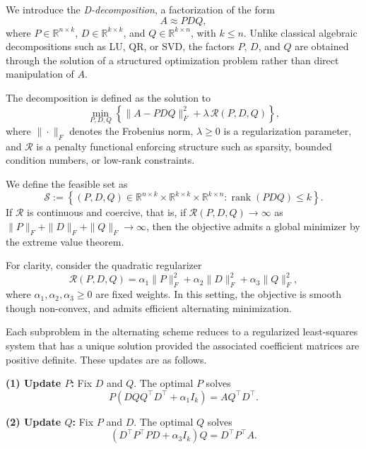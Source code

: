 \documentclass[10pt,a4paper]{article}
\begin{document}
We introduce the \emph{D-decomposition}, a factorization of the form
\[
A \approx P D Q,
\]
where \( P \in \mathbb{R}^{n \times k} \), \( D \in \mathbb{R}^{k \times k} \), and \( Q \in \mathbb{R}^{k \times n} \), with \( k \leq n \). Unlike classical algebraic decompositions such as LU, QR, or SVD, the factors \( P \), \( D \), and \( Q \) are obtained through the solution of a structured optimization problem rather than direct manipulation of \( A \).

The decomposition  is defined as the solution to
\[
\min_{P, D, Q} \left\{ \|A - P D Q\|_F^2 + \lambda \, \mathcal{R}(P, D, Q) \right\},
\]
where \( \| \cdot \|_F \) denotes the Frobenius norm, \( \lambda \geq 0 \) is a regularization parameter, and \( \mathcal{R} \) is a penalty functional enforcing structure such as sparsity, bounded condition numbers, or low-rank constraints.

We define the feasible set as
\[
\mathcal{S} := \left\{ (P, D, Q) \in \mathbb{R}^{n \times k} \times \mathbb{R}^{k \times k} \times \mathbb{R}^{k \times n} : \operatorname{rank}(P D Q) \leq k \right\}.
\]
If \( \mathcal{R} \) is continuous and coercive, that is, if \( \mathcal{R}(P,D,Q) \to \infty \) as \( \|P\|_F + \|D\|_F + \|Q\|_F \to \infty \), then the objective admits a global minimizer by the extreme value theorem.

For clarity, consider the quadratic regularizer
\[
\mathcal{R}(P, D, Q) = \alpha_1 \|P\|_F^2 + \alpha_2 \|D\|_F^2 + \alpha_3 \|Q\|_F^2,
\]
where \( \alpha_1, \alpha_2, \alpha_3 \geq 0 \) are fixed weights. In this setting, the objective is smooth though non-convex, and admits efficient alternating minimization.

Each subproblem in the alternating scheme reduces to a regularized least-squares system that has a unique solution provided the associated coefficient matrices are positive definite. These updates are as follows.

\textbf{(1) Update \( P \):} Fix \( D \) and \( Q \). The optimal \( P \) solves
\[
P (D Q Q^\top D^\top + \alpha_1 I_k) = A Q^\top D^\top.
\]

\textbf{(2) Update \( Q \):} Fix \( P \) and \( D \). The optimal \( Q \) solves
\[
(D^\top P^\top P D + \alpha_3 I_k) Q = D^\top P^\top A.
\]
\end{document}
